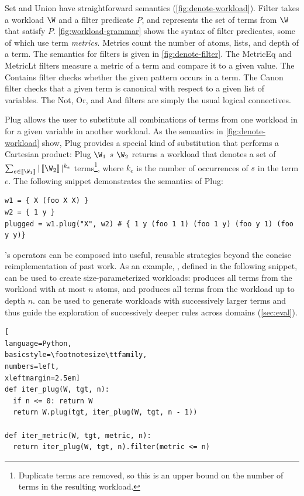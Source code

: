 \textsf{Set} and \textsf{Union}
  have straightforward semantics
  (\autoref{fig:denote-workload}).
\textsf{Filter}
 takes a workload $\W$ and a filter predicate $P$,
 and represents the set of terms from $\W$ that satisfy $P$.
\autoref{fig:workload-grammar} shows the
 syntax of filter predicates,
 some of which use term \textit{metrics}.
Metrics count
 the number of atoms, lists, and
 depth of a term.
The semantics for filters is given in \autoref{fig:denote-filter}.
The \textsf{MetricEq} and \textsf{MetricLt} filters
 measure a metric of a term and compare it to a given value.
The \textsf{Contains} filter
 checks whether the given pattern occurs in a term.
The \textsf{Canon} filter
 checks that a given term is canonical with respect
 to a given list of variables.
The \textsf{Not}, \textsf{Or}, and \textsf{And} filters
 are simply the usual logical connectives.

\textsf{Plug}
  allows the user to substitute all combinations
  of terms from one workload in for
  a given variable in another workload.
As the semantics in \autoref{fig:denote-workload} show,
  \textsf{Plug} provides a special kind of substitution
  that performs a Cartesian product:
  \textsf{Plug $\W_1$ $s$ $\W_2$}
  returns a workload
  that denotes a set of
  $\sum_{e \in \denote{\W_1}} |\denote{\W_2}|^{k_e}$ terms\footnote{
    Duplicate terms are removed, so this is an upper bound on the number
    of terms in the resulting workload.
  },
  where $k_e$ is the number of occurrences of $s$ in the term $e$.
The following \enumo snippet demonstrates
  the semantics of \textsf{Plug}:
\begin{lstlisting}
w1 = { X (foo X X) }
w2 = { 1 y }
plugged = w1.plug("X", w2) # { 1 y (foo 1 1) (foo 1 y) (foo y 1) (foo y y)}
\end{lstlisting}

\enumo's operators can be composed into useful,
  reusable strategies beyond the concise reimplementation
  of past work.
As an example,
  , defined in the following \enumo snippet,
  can be used to create size-parameterized workloads:
   produces all terms
  from the workload
  with at most $n$ atoms, and 
  produces all terms from the workload up to depth $n$. 
  can be used to generate workloads with successively larger terms
  and thus guide the exploration of successively deeper rules
  across domains (\autoref{sec:eval}).

\begin{lstlisting}[
language=Python,
basicstyle=\footnotesize\ttfamily,
numbers=left,
xleftmargin=2.5em]
def iter_plug(W, tgt, n):
  if n <= 0: return W
  return W.plug(tgt, iter_plug(W, tgt, n - 1))

def iter_metric(W, tgt, metric, n):
  return iter_plug(W, tgt, n).filter(metric <= n)
\end{lstlisting}

